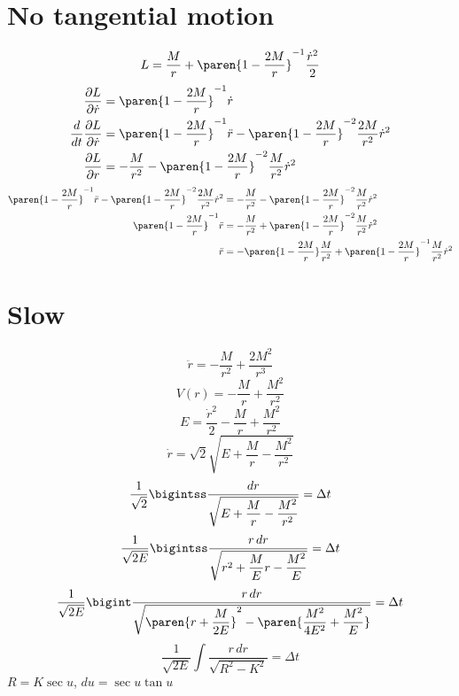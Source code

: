 \documentclass{scrartcl}
\begin{document}
\section{No tangential motion}
\[
  L = \frac{M}{r} + \paren{1-\frac{2M}r}^{-1}\frac{\dot r^2}{2}
\]
\begin{align*}
  \frac{\partial L}{\partial\dot r} &= \paren{1-\frac{2M}r}^{-1}\dot r \\
  \frac{d}{dt} \frac{\partial L}{\partial\dot r} &= \paren{1-\frac{2M}r}^{-1} \ddot r - \paren{1-\frac{2M}{r}}^{-2}\frac{2M}{r^2}\dot r^2 \\
  \frac{\partial L}{\partial r}&= -\frac{M}{r^2} - \paren{1-\frac{2M}{r}}^{-2}\frac{M}{r^2}\dot r^2
\end{align*}
\begin{align*}
  \paren{1-\frac{2M}r}^{-1} \ddot r - \paren{1-\frac{2M}{r}}^{-2}\frac{2M}{r^2}\dot r^2 &= -\frac{M}{r^2} - \paren{1-\frac{2M}{r}}^{-2}\frac{M}{r^2}\dot r^2 \\
  \paren{1-\frac{2M}r}^{-1} \ddot r &= -\frac{M}{r^2} + \paren{1-\frac{2M}{r}}^{-2}\frac{M}{r^2}\dot r^2 \\
  \ddot r &= -\paren{1-\frac{2M}{r}}\frac{M}{r^2} + \paren{1-\frac{2M}{r}}^{-1}\frac{M}{r^2}\dot r^2 \\
\end{align*}

\section{Slow}
\[
  \ddot r = -\frac{M}{r^2} + \frac{2M^2}{r^3}
\]
\[
  V(r) = -\frac{M}{r} + \frac{M^2}{r^2}
\]
\[
  E = \frac{\dot r^2}2 -\frac{M}{r} + \frac{M^2}{r^2}
\]
\[
  \dot r = \sqrt{2}\sqrt{E + \frac{M}r - \frac{M^2}{r^2}}
\]
\[
  \frac{1}{\sqrt 2}\bigintss \dfrac{dr}{\sqrt{E + \dfrac{M}r - \dfrac{M^2}{r^2}}} = \Delta t
\]
\[
  \frac{1}{\sqrt {2E}}\bigintss \dfrac{r\, dr}{\sqrt{r^2 + {\dfrac M E}r - {\dfrac {M^2}E}}} = \Delta t
\]
\[
  \frac{1}{\sqrt {2E}}\bigint \dfrac{r\, dr}{\sqrt{\paren{r+\dfrac{M}{2E}}^2  -\paren{\dfrac{M^2}{4E^2} + \dfrac{M^2}{E}}}} = \Delta t
\]
\[
  \frac{1}{\sqrt {2E}}\int \frac{r\, dr}{\sqrt{R^2-K^2}} = \Delta t
\]
\(R=K\sec u\), \(du = \sec u \tan u\)
\end{document}
